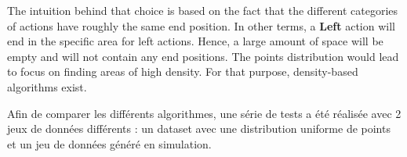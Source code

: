 \documentclass{llncs}
\begin{document}


The intuition behind that choice is based on the fact that the different categories of actions have roughly the same end position. In other terms, a \textbf{Left} action will end in the specific area for left actions. Hence, a large amount of space will be empty and will not contain any end positions. The points distribution would lead to focus on finding areas of high density. For that purpose, density-based algorithms exist.

Afin de comparer les différents algorithmes, une série de tests a été réalisée avec 2 jeux de données différents : un dataset avec une distribution uniforme de points et un jeu de données généré en simulation.




%

\end{document}
